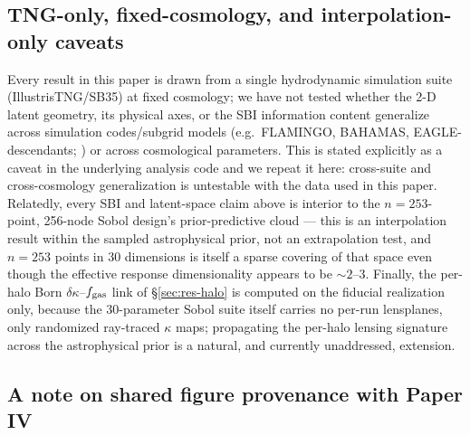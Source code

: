 \documentclass[11pt]{article}
\newcommand{\fgas}{f_{\rm gas}}
\begin{document}
\subsection{TNG-only, fixed-cosmology, and interpolation-only caveats}

Every result in this paper is drawn from a single hydrodynamic simulation
suite (IllustrisTNG/SB35) at fixed cosmology; we have not tested whether
the 2-D latent geometry, its physical axes, or the SBI information content
generalize across simulation codes/subgrid models (e.g.\ FLAMINGO,
BAHAMAS, EAGLE-descendants; \citealp{Schaye2023FLAMINGO}) or across
cosmological parameters. This is stated explicitly as a caveat in the
underlying analysis code and we repeat it here: cross-suite and
cross-cosmology generalization is untestable with the data used in this
paper. %
Relatedly, every SBI and latent-space claim above is interior to the
$n=253$-point, 256-node Sobol design's prior-predictive cloud — this is an
interpolation result within the sampled astrophysical prior, not an
extrapolation test, and $n=253$ points in 30 dimensions is itself a sparse
covering of that space even though the effective response dimensionality
appears to be $\sim\!2$–$3$. %
Finally, the per-halo Born $\delta\kappa$--$\fgas$ link of
\S\ref{sec:res-halo} is computed on the fiducial realization only, because
the 30-parameter Sobol suite itself carries no per-run lensplanes, only
randomized ray-traced $\kappa$ maps; propagating the per-halo lensing
signature across the astrophysical prior is a natural, and currently
unaddressed, extension. %

\subsection{A note on shared figure provenance with Paper IV}
\end{document}
